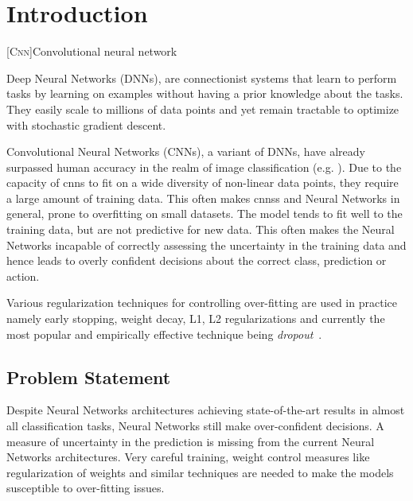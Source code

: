 \chapter{Introduction}  %

\ifpdf
    \graphicspath{{Chapter1/Figs/Raster/}{Chapter1/Figs/PDF/}{Chapter1/Figs/}}
\else
    \graphicspath{{Chapter1/Figs/Vector/}{Chapter1/Figs/}}
\fi



[\textsc{Cnn}]{Convolutional neural network}

Deep Neural Networks (DNNs), are connectionist systems that learn to perform tasks by learning on examples without having a prior knowledge about the tasks. 
They easily scale to millions of data points and yet remain tractable to optimize with stochastic gradient descent.

Convolutional Neural Networks (CNNs), a variant of DNNs, have already surpassed human accuracy in the realm of image classification (e.g. \cite{he2016deep,simonyan2014very,krizhevsky2012imagenet}). Due to the capacity of \acp{cnn} to fit on a wide diversity of non-linear data points, they require a large amount of training data. This often makes \acp{cnn}s and Neural Networks in general, prone to overfitting on small datasets. The model tends to fit well to the training data, but are not predictive for new data. This often makes the Neural Networks incapable of correctly assessing the uncertainty in the training data and hence leads to overly confident decisions about the correct class, prediction or action.

Various regularization techniques for controlling over-fitting are used in practice namely early stopping, weight decay, L1, L2 regularizations and currently the most popular and empirically effective technique being \emph{dropout}~\cite{hinton2012improving}. 


\section{Problem Statement}

Despite Neural Networks architectures achieving state-of-the-art results in almost all classification tasks, Neural Networks still make over-confident decisions. A measure of uncertainty in the prediction is missing from the current Neural Networks architectures. Very careful training, weight control measures like regularization of weights and similar techniques are needed to make the models susceptible to over-fitting issues. 

